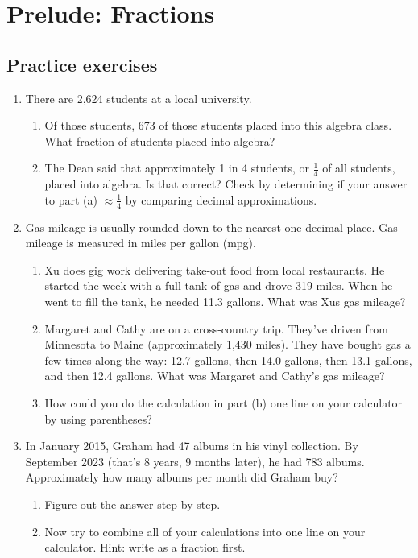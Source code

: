 
\section{Prelude: Fractions} 

\subsection*{Practice exercises}

\begin{enumerate}

\item There are 2,624 students at a local university.  
\begin{enumerate}
\item Of those students, 673 of those students placed into this algebra class.  What fraction of students placed into algebra? 
\vfill
\item The Dean said that approximately 1 in 4 students, or $\frac{1}{4}$ of all students, placed into algebra.  Is that correct?  Check by determining if your answer to part (a) $\approx \frac{1}{4}$ by comparing decimal approximations. 
\vfill
\end{enumerate}

\item Gas mileage is usually rounded down to the nearest one decimal place. Gas mileage is measured in miles per gallon (mpg).
\begin{enumerate}
\item Xu does gig work delivering take-out food from local restaurants.  He started the week with a full tank of gas and drove 319 miles.  When he went to fill the tank, he needed 11.3 gallons. What was Xus gas mileage?
\vfill
\item Margaret and Cathy are on a cross-country trip.  They've driven from Minnesota to Maine (approximately 1,430 miles).  They have bought gas a few times along the way:  12.7 gallons, then 14.0 gallons, then 13.1 gallons, and then 12.4 gallons.  What was Margaret and Cathy's gas mileage? 
\vfill
\item How could you do the calculation in part (b) one line on your calculator by using parentheses?
\vfill
\end{enumerate}

\newpage %

\item In January 2015, Graham had 47 albums in his vinyl collection.  By September 2023 (that's 8 years, 9 months later), he had 783 albums.  Approximately how many albums per month did Graham buy?
\begin{enumerate}
\item Figure out the answer step by step.
\vfill
\vfill
\item Now try to combine all of your calculations into one line on your calculator.  Hint:  write as a fraction first.
\vfill
\end{enumerate}


\end{enumerate}

